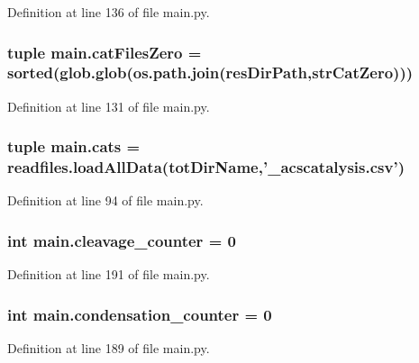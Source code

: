 Definition at line 136 of file main.\+py.

\hypertarget{a00153_a7ab6089d577bd60acf22b92e84930523}{
\subsubsection[{cat\+Files\+Zero}]{\setlength{\rightskip}{0pt plus 5cm}tuple main.\+cat\+Files\+Zero = sorted(glob.\+glob(os.\+path.\+join({\bf res\+Dir\+Path},{\bf str\+Cat\+Zero})))}}\label{a00153_a7ab6089d577bd60acf22b92e84930523}


Definition at line 131 of file main.\+py.

\hypertarget{a00153_adc0282a6415a88834556e66807bcc800}{
\subsubsection[{cats}]{\setlength{\rightskip}{0pt plus 5cm}tuple main.\+cats = readfiles.\+load\+All\+Data({\bf tot\+Dir\+Name},'\+\_\+acscatalysis.\+csv')}}\label{a00153_adc0282a6415a88834556e66807bcc800}


Definition at line 94 of file main.\+py.

\hypertarget{a00153_aba28788973ae3e9140b53078efe5d204}{
\subsubsection[{cleavage\+\_\+counter}]{\setlength{\rightskip}{0pt plus 5cm}int main.\+cleavage\+\_\+counter = 0}}\label{a00153_aba28788973ae3e9140b53078efe5d204}


Definition at line 191 of file main.\+py.

\hypertarget{a00153_a358b60986e7e25df0dfb61562b7aa3e2}{
\subsubsection[{condensation\+\_\+counter}]{\setlength{\rightskip}{0pt plus 5cm}int main.\+condensation\+\_\+counter = 0}}\label{a00153_a358b60986e7e25df0dfb61562b7aa3e2}


Definition at line 189 of file main.\+py.

